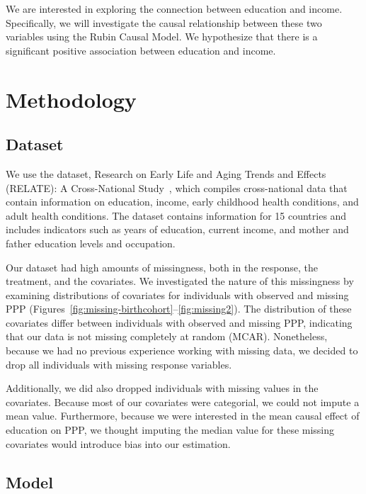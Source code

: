 \documentclass[letterpaper,11pt]{article}
\begin{document}
We are interested in exploring the connection between education and income.
Specifically, we will investigate the causal relationship between these two
variables using the Rubin Causal Model. We hypothesize that there is a
significant positive association between education and income.

\section{Methodology}


\subsection{Dataset}

We use the dataset, Research on Early Life and Aging Trends and Effects
(RELATE): A Cross-National Study~\cite{relate}, which compiles cross-national
data that contain information on education, income, early childhood health
conditions, and adult health conditions. The dataset contains information for 15
countries and includes indicators such as years of education, current income,
and mother and father education levels and occupation.

Our dataset had high amounts of missingness, both in the response, the
treatment, and the covariates. We investigated the nature of this missingness by
examining distributions of covariates for individuals with observed and missing
PPP (Figures~\ref{fig:missing-birthcohort}--\ref{fig:missing2}).  The
distribution of these covariates differ between individuals with observed and
missing PPP, indicating that our data is not missing completely at random
(MCAR).  Nonetheless, because we had no previous experience working with missing
data, we decided to drop all individuals with missing response variables.

Additionally, we did also dropped individuals with missing values in the
covariates.  Because most of our covariates were categorial, we could not impute
a mean value.  Furthermore, because we were interested in the mean causal effect
of education on PPP, we thought imputing the median value for these missing
covariates would introduce bias into our estimation.


\subsection{Model}
\end{document}
